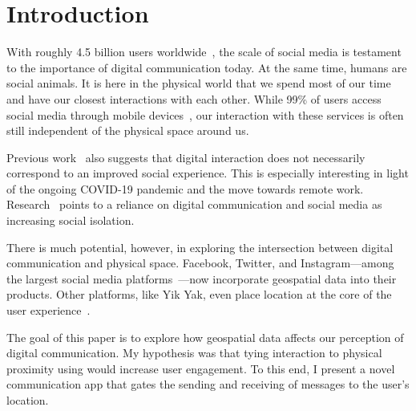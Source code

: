 \section{Introduction}

With roughly 4.5 billion users worldwide~\cite{umaine_2021}, the scale of social media is testament to the importance of digital communication today. At the same time, humans are social animals. It is here in the physical world that we spend most of our time and have our closest interactions with each other. While 99\% of users access social media through mobile devices~\cite{umaine_2021}, our interaction with these services is often still independent of the physical space around us.

Previous work~\cite{ducheneaut_2006} also suggests that digital interaction does not necessarily correspond to an improved social experience. This is especially interesting in light of the ongoing \textsc{COVID-19} pandemic and the move towards remote work. Research~\cite{bonsaksen_2021,mann_2003} points to a reliance on digital communication and social media as increasing social isolation.

There is much potential, however, in exploring the intersection between digital communication and physical space. Facebook, Twitter, and Instagram—among the largest social media platforms~\cite{umaine_2021}—now incorporate geospatial data into their products. Other platforms, like Yik Yak, even place location at the core of the user experience~\cite{yikyak_2015}.

The goal of this paper is to explore how geospatial data affects our perception of digital communication. My hypothesis was that tying interaction to physical proximity using would increase user engagement. To this end, I present a novel communication app that gates the sending and receiving of messages to the user's location.
